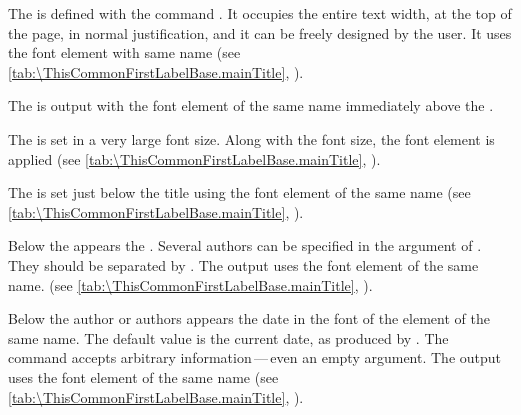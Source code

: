 \BeginIndexGroup{}%
%
The %
 is defined with the command
. It occupies the entire text width, at the top of the page,
in normal justification, and it can be freely designed by the user. It uses
the font element with same name (see
\autoref{tab:\ThisCommonFirstLabelBase.mainTitle},
).%
\EndIndexGroup

\BeginIndexGroup{}%
The  is
output with the font element of the same name
immediately above the .%
\EndIndexGroup

\BeginIndexGroup{}%
The  is set in a very large font size.
Along with the font size, the font element
%
 is applied (see
\autoref{tab:\ThisCommonFirstLabelBase.mainTitle},
).%
\EndIndexGroup

\BeginIndexGroup{}%
The
 is set just below the title using the font
element of the same name (see
\autoref{tab:\ThisCommonFirstLabelBase.mainTitle},
).%
\EndIndexGroup

\BeginIndexGroup{}%
Below the  appears the
. Several authors can be specified in
the argument of . They should be separated by
. The output uses the font 
element of the same name. (see
\autoref{tab:\ThisCommonFirstLabelBase.mainTitle},
).%
\EndIndexGroup

\BeginIndexGroup{}%
Below the author or authors appears the
date in the font of the element of the same name. The default
value is the current date, as produced by . The
 command accepts arbitrary information\,---\,even an empty
argument. The output uses the font element of
the same name (see \autoref{tab:\ThisCommonFirstLabelBase.mainTitle},
).%
\EndIndexGroup

